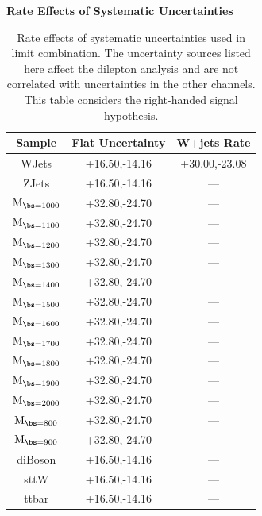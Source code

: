 \begin{table}[htcb]
\begin{center}
\begin{small}
\bf{Rate Effects of Systematic Uncertainties}\\
\begin{tabular}{c||c|c}
\hline\hline 
Sample & Flat Uncertainty & W+jets Rate\\ 
\hline\hline 
WJets & +16.50,-14.16 & +30.00,-23.08 \\  
ZJets & +16.50,-14.16 & --- \\  
$\mathrm{M_{\bs=1000}}$ & +32.80,-24.70 & --- \\  
$\mathrm{M_{\bs=1100}}$ & +32.80,-24.70 & --- \\  
$\mathrm{M_{\bs=1200}}$ & +32.80,-24.70 & --- \\  
$\mathrm{M_{\bs=1300}}$ & +32.80,-24.70 & --- \\  
$\mathrm{M_{\bs=1400}}$ & +32.80,-24.70 & --- \\  
$\mathrm{M_{\bs=1500}}$ & +32.80,-24.70 & --- \\ 
$\mathrm{M_{\bs=1600}}$ & +32.80,-24.70 & --- \\  
$\mathrm{M_{\bs=1700}}$ & +32.80,-24.70 & --- \\  
$\mathrm{M_{\bs=1800}}$ & +32.80,-24.70 & --- \\  
$\mathrm{M_{\bs=1900}}$ & +32.80,-24.70 & --- \\  
$\mathrm{M_{\bs=2000}}$ & +32.80,-24.70 & --- \\  
$\mathrm{M_{\bs=800}}$ & +32.80,-24.70 & --- \\  
$\mathrm{M_{\bs=900}}$ & +32.80,-24.70 & --- \\  
diBoson & +16.50,-14.16 & --- \\  
sttW & +16.50,-14.16 & --- \\  
ttbar & +16.50,-14.16 & --- \\ 
\hline
\end{tabular}
\caption{Rate effects of systematic uncertainties used in limit combination.  The uncertainty sources listed here affect the dilepton analysis and are not correlated with uncertainties in the other channels.  This table considers the right-handed signal hypothesis.}
\label{table:bsRsysDi}
\end{small}
\end{center}
\end{table}

\clearpage


